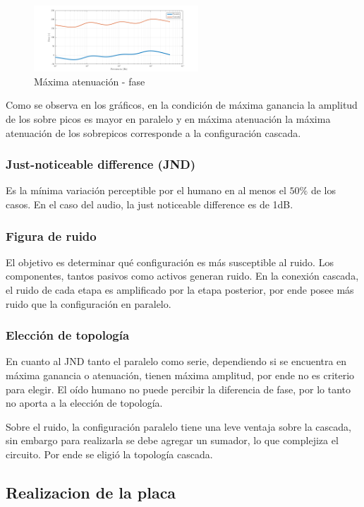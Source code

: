 \documentclass[../../tc_tp3_main.tex]{subfiles}
\begin{document}
\begin{figure}[H]
\centering
\includegraphics[width=0.55\textwidth]{imagenes/parCasSimMin_f.png}
\caption{M\'axima atenuación - fase} 
\end{figure}

Como se observa en los gráficos, en la condición de máxima ganancia la amplitud de los sobre picos es mayor en paralelo y en máxima atenuación la máxima atenuación de los sobrepicos corresponde a la configuración cascada.


\subsubsection{Just-noticeable difference (JND)}
Es la m\'inima variaci\'on perceptible por el humano en al menos el $50\%$ de los casos. En el caso del audio, la just noticeable difference es de 1dB.
\subsubsection{Figura de ruido}

El objetivo es determinar qu\'e configuración es más susceptible al ruido. Los componentes, tantos pasivos como activos generan ruido. En la conexión cascada, el ruido de cada etapa es amplificado por la etapa posterior, por ende posee más ruido que la configuración en paralelo.

\subsubsection{Elección de topología}

En cuanto al JND tanto el paralelo como  serie, dependiendo si se encuentra en máxima ganancia o atenuación, tienen máxima amplitud, por ende no es criterio para elegir. El oído humano no puede percibir la diferencia de fase, por lo tanto no aporta a la elección de topología.\par 
Sobre el ruido, la configuración paralelo tiene una leve ventaja sobre la cascada, sin embargo para realizarla se debe agregar un sumador, lo que complejiza el circuito. Por ende se eligió la topología cascada.

\subsection{Realizacion de la placa}
\end{document}
